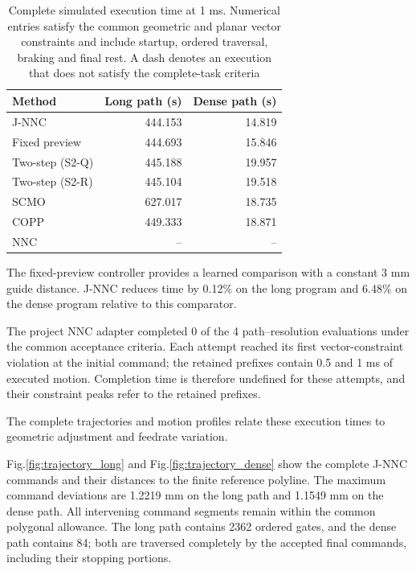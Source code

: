 \documentclass[pdflatex,sn-apa]{sn-jnl}
\begin{document}
\begin{table}[htbp]
\centering
\caption{Complete simulated execution time at 1 ms. Numerical entries satisfy the common geometric and planar vector constraints and include startup, ordered traversal, braking and final rest. A dash denotes an execution that does not satisfy the complete-task criteria}
\label{tab:complete_times}
\small
\begin{tabular}{lrr}
\toprule
Method & Long path (s) & Dense path (s) \\
\midrule
J-NNC & 444.153 & 14.819 \\
Fixed preview & 444.693 & 15.846 \\
Two-step (S2-Q) & 445.188 & 19.957 \\
Two-step (S2-R) & 445.104 & 19.518 \\
SCMO & 627.017 & 18.735 \\
COPP & 449.333 & 18.871 \\
NNC & -- & -- \\
\bottomrule
\end{tabular}
\end{table}


The fixed-preview controller provides a learned comparison with a constant 3 mm guide distance. J-NNC reduces time by 0.12\% on the long program and 6.48\% on the dense program relative to this comparator.

The project NNC adapter completed 0 of the 4 path--resolution evaluations under the common acceptance criteria. Each attempt reached its first vector-constraint violation at the initial command; the retained prefixes contain 0.5 and 1 ms of executed motion. Completion time is therefore undefined for these attempts, and their constraint peaks refer to the retained prefixes.


The complete trajectories and motion profiles relate these execution times to geometric adjustment and feedrate variation.

Fig.\nobreakspace\ref{fig:trajectory_long} and Fig.\nobreakspace\ref{fig:trajectory_dense} show the complete J-NNC commands and their distances to the finite reference polyline. The maximum command deviations are 1.2219{} mm on the long path and 1.1549{} mm on the dense path. All intervening command segments remain within the common polygonal allowance. The long path contains 2362{} ordered gates, and the dense path contains 84{}; both are traversed completely by the accepted final commands, including their stopping portions.
\end{document}
